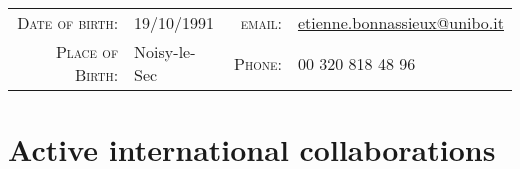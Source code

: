 \documentclass[10pt]{article} %
\begin{document}
\pagestyle{empty} %




\par{\bigskip\par} %
\begin{center}
\begin{tabular}{rl|rl}
\textsc{Date of birth:} & 19/10/1991 &
\textsc{email:} & \href{mailto:etienne.bonnassieux@obspm.fr}{etienne.bonnassieux@unibo.it}\\
\textsc{Place of Birth:} &Noisy-le-Sec &
\textsc{Phone:} & 00 320 818 48 96
\end{tabular}
\end{center}

\vspace{0.5cm}


\section{Active international collaborations}
\end{document}
